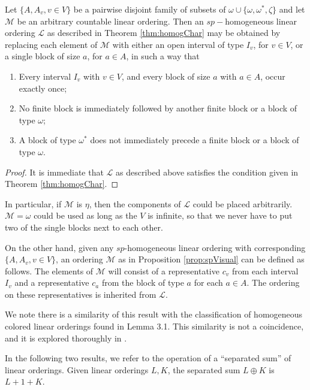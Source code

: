 \documentclass[11pt]{amsart}
\theoremstyle{definition}
\def\sL{\mathcal L}
\def\sM{{\mathcal M}}
\begin{document}
\begin{proposition} \label{prop:spVisual} Let $\{A,A_v, v \in V\}$ be a pairwise disjoint family  of subsets of $\omega \cup \{\omega,\omega^*,\zeta\}$ and let $\sM$ be an arbitrary countable linear ordering.  Then an $sp-$homogeneous linear ordering $\sL$ as described in Theorem \ref{thm:homogChar} may be obtained by replacing each element of $\sM$ with either an open interval of type $I_v$, for $v \in V$, or a single block of size $a$, for $a \in A$, in such a way that
\begin{enumerate}
\item Every interval $I_v$ with $v\in V$, and every block of size $a$ with $a \in A$, occur exactly once;
\item No finite block is immediately followed by another finite block or a block of type $\omega$;  
\item A block of type $\omega^*$ does not immediately precede a finite block or a block of type $\omega$.
\end{enumerate}
\end{proposition}

\begin{proof}  It is immediate that $\sL$ as described above satisfies the condition given in Theorem \ref{thm:homogChar}.
\end{proof}

In particular, if $\sM$ is $\eta$,  then the components of $\sL$ could be placed arbitrarily. $\sM = \omega$ could be used as long as the $V$ is infinite, so that we never have to put two of the single blocks next to each other.  

On the other hand, given any $sp$-homogeneous linear ordering with corresponding $\{A,A_v, v \in V\}$, an ordering $\sM$ as in Proposition \ref{prop:spVisual} can be defined as follows. The elements of $\sM$ will consist of a representative $c_v$ from each interval $I_v$ and a representative $c_a$ from the block of type $a$ for each $a \in A$. The ordering on these representatives is inherited from $\sL$. 


We note there is a similarity of this result with the classification of homogeneous colored linear orderings found in \cite{ST08} Lemma 3.1.
This similarity is not a coincidence, and it is explored thoroughly in \cite{GComb}.



In the following two results, we refer to the operation of a ``separated sum'' of linear orderings.  Given linear orderings $L,K$, the separated sum $L \oplus K$ is $L + 1 + K$.
\end{document}
